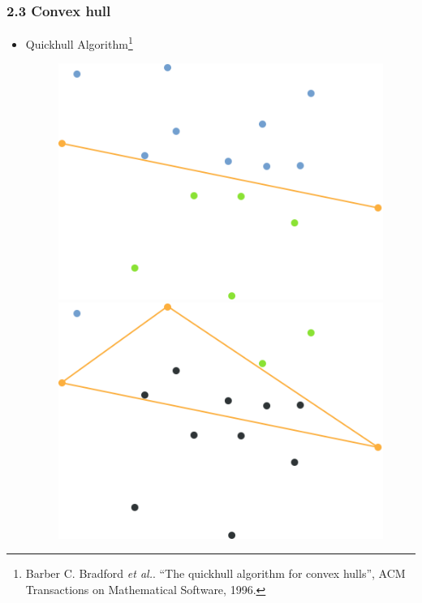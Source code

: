 \documentclass[notheorems,serif,table,compress]{beamer}  %
\begin{document}
\begin{frame}
\frametitle{2.3 Convex hull}
    \begin{itemize}
        \item Quickhull Algorithm\footnote{Barber C. Bradford \textit{et al.}. ``The quickhull algorithm for convex hulls'', ACM Transactions on Mathematical Software, 1996.}
        \begin{figure}
              \centering
              \begin{minipage}[t]{0.35\linewidth}
              \includegraphics[width=1\linewidth]{quick1}
              \end{minipage}
              \pause
              \begin{minipage}[t]{0.35\linewidth}
              \includegraphics[width=1\linewidth]{quick2}

\end{minipage}
\end{figure}
\end{itemize}
\end{frame}
\end{document}
